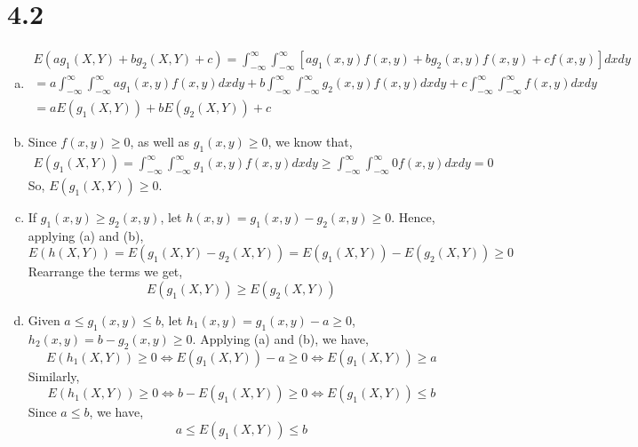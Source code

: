 \documentclass[letterpaper]{article}
\newcommand{\intii}{\int_{-\infty}^\infty}
\begin{document}
    \section*{4.2}
    \begin{enumerate}[(a)]
    \item 
    \begin{eqnarray*}
    E(a g_1(X,Y) + b g_2(X, Y) + c) = \intii \intii \left[ a g_1(x, y)f(x,y) + b g_2(x, y)f(x, y) + cf(x,y) \right] dx dy \\
    = a \intii \intii a g_1(x,y)f(x,y) dxdy + b \intii \intii g_2(x,y) f(x,y) dxdy + c \intii \intii f(x,y)dxdy \\
    = aE(g_1(X, Y)) + bE(g_2(X,Y)) + c
    \end{eqnarray*}
    \item Since $f(x,y) \ge 0$, as well as $g_1(x, y) \ge 0$, we know that,
    \begin{eqnarray*}
    E(g_1(X,Y)) = \intii \intii g_1(x,y) f(x,y)dxdy \ge \intii \intii 0 f(x, y) dx dy = 0
    \end{eqnarray*}
    So, $E(g_1(X,Y)) \ge 0$.
    \item If $g_1(x, y) \ge g_2(x, y)$, let $h(x, y) = g_1(x, y) - g_2(x, y) \ge 0$.
    Hence, applying (a) and (b),
    \[
    E(h(X, Y)) = E(g_1(X, Y) - g_2(X, Y)) = E(g_1(X, Y)) - E(g_2(X, Y)) \ge 0
    \]
    Rearrange the terms we get,
    \[
    E(g_1(X, Y)) \ge E(g_2(X, Y))
    \]
    \item
    Given $a \le g_1(x, y) \le b$, let $h_1(x, y) = g_1(x, y) - a \ge 0$, $h_2(x, y) = b - g_2(x, y) \ge 0$. 
    Applying (a) and (b), we have,
    \[
    E(h_1(X, Y)) \ge 0 \iff E(g_1(X, Y)) - a \ge 0 \iff E(g_1(X, Y)) \ge a
    \]
    Similarly,
    \[
    E(h_1(X, Y)) \ge 0 \iff b - E(g_1(X, Y)) \ge 0 \iff E(g_1(X, Y)) \le b
    \]
    Since $a \le b$, we have,
    \[
    a \le E(g_1(X, Y)) \le b
    \]
    \end{enumerate}
\end{document}
